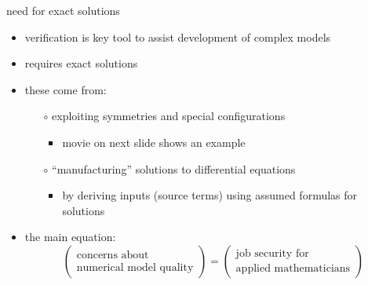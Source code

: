 \documentclass[10pt,hyperref={pdfpagelabels=true}]{beamer}
\begin{document}
\begin{frame}{need for exact solutions}

\begin{itemize}
\item verification is key tool to assist development of complex models
\item \alert{requires exact solutions}
\item these come from:
    \begin{itemize}
    \item[$\circ$] exploiting symmetries and special configurations
        \begin{itemize}
        \item \alert{movie on next slide} shows an example
        \end{itemize}
    \item[$\circ$] ``manufacturing'' solutions to differential equations
        \begin{itemize}
        \item by deriving inputs (source terms) using assumed formulas for solutions
        \end{itemize}
    \end{itemize}

\bigskip
\item the main equation:
   $$\left(\begin{matrix}
   \text{concerns about} \\ \text{numerical model quality}
   \end{matrix}\right)
   = \left(\begin{matrix}
      \text{job security for} \\ \text{applied mathematicians}
   \end{matrix} \right)$$
\end{itemize}
\end{frame}
\end{document}
